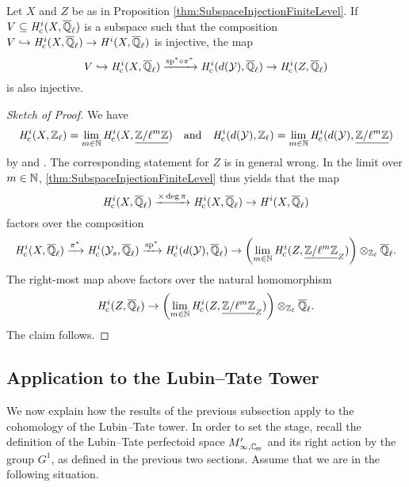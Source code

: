 \documentclass[../main.tex]{subfiles}
\begin{document}
\begin{thm}\label{thm:MiedaInjectivityAtFiniteLevel}
  Let $X$ and $Z$ be as in Proposition \ref{thm:SubspaceInjectionFiniteLevel}.
  If $V \subseteq \mathit H_{\mathrm{c}}^i(X, {\overline {\mathbb{Q}}_\ell})$ is a subspace such that the 
  composition $V \hookrightarrow \mathit H_{\mathrm{c}}^i(X, {\overline {\mathbb{Q}}_\ell}) \to \mathit H^i(X, {\overline {\mathbb{Q}}_\ell})$ is injective,
  the map 
  \begin{equation*}
    V \hookrightarrow \mathit H_{\mathrm{c}}^i(X, {\overline {\mathbb{Q}}_\ell}) \xrightarrow{\mathrm{sp}^* \circ \pi^*}
    \mathit H_{\mathrm{c}}^i(d(\mathcal{Y}), {\overline {\mathbb{Q}}_\ell}) \to \mathit H_{\mathrm{c}}^i(Z, {\overline {\mathbb{Q}}_\ell})
  \end{equation*}
  is also injective.
  \begin{proof}[Sketch of Proof] 
  We have 
  \begin{equation*}
    \mathit H_{\mathrm{c}}^i(X, \mathbb{Z}_\ell) = \lim_{m \in \mathbb{N}} \mathit H_{\mathrm{c}}^i(X, \underline{\mathbb{Z}/\ell^m\mathbb{Z}}) 
    \quad \text{and} \quad \mathit H_{\mathrm{c}}^i(d(\mathcal{Y}), \mathbb{Z}_\ell) = \lim_{m \in \mathbb{N}}
    \mathit H_{\mathrm{c}}^i(d(\mathcal{Y}), \underline{\mathbb{Z}/\ell^m\mathbb{Z}})
  \end{equation*}
  by \cite[Corollary 9.3.3 and Proposition 10.1.15]{LeiFuEtale} and 
  \cite[Theorem 3.1]{huber1998comparison}. The corresponding statement for
$Z$ is in general wrong. In the limit over $m \in \mathbb{N}$,
  \cref{thm:SubspaceInjectionFiniteLevel} thus yields that the map
  \begin{equation*}
    \mathit H_{\mathrm{c}}^i(X, {\overline {\mathbb{Q}}_\ell}) \xrightarrow{\times \deg \pi} \mathit H_{\mathrm{c}}^i(X, {\overline {\mathbb{Q}}_\ell}) \to \mathit H^i(X, {\overline {\mathbb{Q}}_\ell})
  \end{equation*}
  factors over the composition
  \begin{equation*}
    \mathit H_{\mathrm{c}}^i(X,      {\overline {\mathbb{Q}}_\ell}) \xrightarrow{\pi^*}
    \mathit H_{\mathrm{c}}^i(\mathcal{Y}_s,  {\overline {\mathbb{Q}}_\ell}) \xrightarrow{\mathrm{sp}^*}
    \mathit H_{\mathrm{c}}^i(d(\mathcal{Y}), {\overline {\mathbb{Q}}_\ell}) \to 
    \left(\lim_{m \in \mathbb{N}} \mathit H_{\mathrm{c}}^i(Z, \underline{\mathbb{Z}/\ell^m\mathbb{Z}}_Z) \right) \otimes_{\mathbb{Z}_\ell}
    {\overline {\mathbb{Q}}_\ell}.
  \end{equation*}
  The right-most map above factors over the natural homomorphism
  $$\mathit H_{\mathrm{c}}^i(Z, {\overline {\mathbb{Q}}_\ell}) \to \left(\lim_{m \in \mathbb{N}} \mathit H_{\mathrm{c}}^i(Z,
  \underline{\mathbb{Z}/\ell^m\mathbb{Z}}_Z) \right) \otimes_{\mathbb{Z}_\ell} {\overline {\mathbb{Q}}_\ell}.$$ 
  The claim follows.
\end{proof}
\end{thm}


\subsection{Application to the Lubin--Tate Tower} %
\label{sub:Application to the Lubin--Tate Tower}

We now explain how the results of the previous subsection apply to the 
cohomology of the Lubin--Tate tower. In order to set the stage, recall the 
definition of the Lubin--Tate perfectoid space $M'_{\infty, \Cp}$ and its
right action by the group $G^1$, as defined in the previous two sections.
Assume that we are in the following situation.
\end{document}
